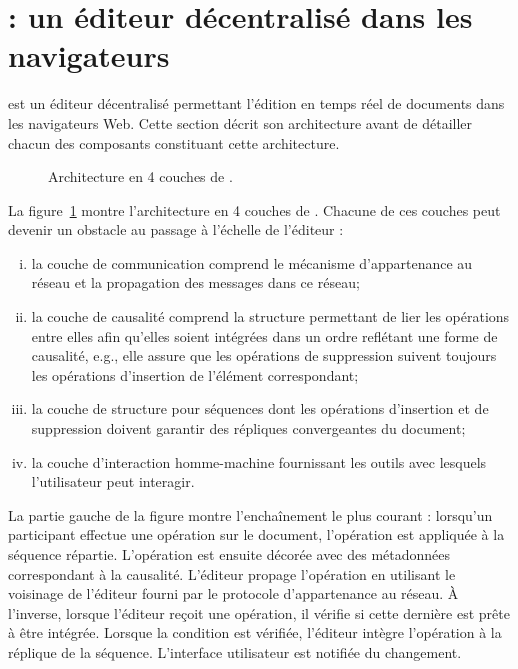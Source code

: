 
\section{\CRATE : un éditeur décentralisé dans les navigateurs}
\label{editor:sec:crate}

\CRATE est un éditeur décentralisé permettant l'édition en temps réel de
documents dans les navigateurs Web. Cette section décrit son architecture avant
de détailler chacun des composants constituant cette architecture.

\begin{figure}
  \begin{center}
    
    \caption[Architecture de \CRATE]
    {\label{editor:fig:architecture}Architecture en 4 couches de \CRATE.}
  \end{center}
\end{figure}

La figure~\ref{editor:fig:architecture} montre l'architecture en 4 couches de
\CRATE. Chacune de ces couches peut devenir un obstacle au passage à l'échelle
de l'éditeur :
\begin{enumerate}[(i)]
\item la couche de communication comprend le mécanisme d'appartenance au réseau
  et la propagation des messages dans ce réseau;
\item la couche de causalité comprend la structure permettant de lier les
  opérations entre elles afin qu'elles soient intégrées dans un ordre reflétant
  une forme de causalité, e.g., elle assure que les opérations de suppression
  suivent toujours les opérations d'insertion de l'élément correspondant;
\item la couche de structure pour séquences dont les opérations d'insertion et
  de suppression doivent garantir des répliques convergeantes du document;
\item la couche d'interaction homme-machine fournissant les outils avec lesquels
  l'utilisateur peut interagir.
\end{enumerate}

\noindent La partie gauche de la figure montre l'enchaînement le plus courant :
lorsqu'un participant effectue une opération sur le document, l'opération est
appliquée à la séquence répartie. L'opération est ensuite décorée avec des
métadonnées correspondant à la causalité. L'éditeur propage l'opération en
utilisant le voisinage de l'éditeur fourni par le protocole d'appartenance au
réseau.  À l'inverse, lorsque l'éditeur reçoit une opération, il vérifie si
cette dernière est prête à être intégrée. Lorsque la condition est vérifiée,
l'éditeur intègre l'opération à la réplique de la séquence. L'interface
utilisateur est notifiée du changement.

